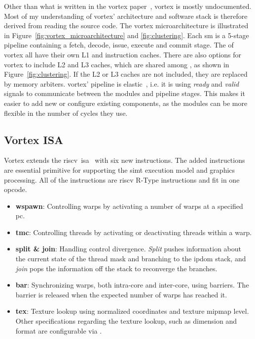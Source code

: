 Other than what is written in the \Gls{vortex} paper~\cite{Aurud_Project}, \Gls{vortex} is mostly undocumented. Most of my understanding of \Gls{vortex}' architecture and software stack is therefore derived from reading the source code. The \Gls{vortex} microarchitecture is illustrated in Figure~\ref{fig:vortex_microarchitecture} and \ref{fig:clustering}. Each \acrshort{sm} is a 5-stage pipeline containing a fetch, decode, issue, execute and commit stage. The  of \Gls{vortex} all have their own L1 and instruction caches. There are also options for \Gls{vortex} to include L2 and L3 caches, which are shared among , as shown in Figure~\ref{fig:clustering}. If the L2 or L3 caches are not included, they are replaced by memory arbiters. \Gls{vortex}' pipeline is elastic~\cite{elastic_pipeline}, i.e. it is using \textit{ready} and \textit{valid} signals to communicate between the modules and pipeline stages. This makes it easier to add new or configure existing components, as the modules can be more flexible in the number of cycles they use.

\subsection{Vortex ISA}

Vortex extends the \gls{riscv}~\acrshort{isa}~\cite{riscv-isa} with six new instructions. The added instructions are essential primitive for supporting the \acrshort{simt} execution model and graphics processing. All of the instructions are \Gls{riscv} R-Type instructions and fit in one opcode.
\begin{itemize}
    \item \textbf{wspawn}: Controlling warps by activating a number of warps at a specified \acrshort{pc}.
    \item \textbf{tmc}: Controlling threads by activating or deactivating threads within a warp. 
    \item \textbf{split \& join}: Handling control divergence. \textit{Split} pushes information about the current state of the thread mask and branching to the \acrfull{ipdom} stack, and \textit{join} pops the information off the stack to reconverge the branches.
    \item \textbf{bar}: Synchronizing warps, both intra-core and inter-core, using barriers. The barrier is released when the expected number of warps has reached it.  
    \item \textbf{tex}: Texture lookup using normalized coordinates and texture mipmap level. Other specifications regarding the texture lookup, such as dimension and format are configurable via .
\end{itemize}

